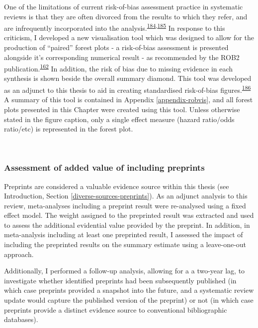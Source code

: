 \documentclass[a4paper, twoside]{templates/ociamthesis}
\begin{document}
One of the limitations of current risk-of-bias assessment practice in systematic reviews is that they are often divorced from the results to which they refer, and are infrequently incorporated into the analysis.\textsuperscript{\protect\hyperlink{ref-marusic2020}{184},\protect\hyperlink{ref-katikireddi2015}{185}} In response to this criticism, I developed a new visualisation tool which was designed to allow for the production of ``paired'' forest plots - a risk-of-bias assessment is presented alongside it's corresponding numerical result - as recommended by the ROB2 publication.\textsuperscript{\protect\hyperlink{ref-sterne2019}{162}} In addition, the risk of bias due to missing evidence in each synthesis is shown beside the overall summary diamond. This tool was developed as an adjunct to this thesis to aid in creating standardised risk-of-bias figures.\textsuperscript{\protect\hyperlink{ref-mcguinness2020robvisPaper}{186}} A summary of this tool is contained in Appendix \ref{appendix-robvis}, and all forest plots presented in this Chapter were created using this tool. Unless otherwise stated in the figure caption, only a single effect measure (hazard ratio/odds ratio/etc) is represented in the forest plot.

~

\hypertarget{assessment-of-added-value-of-including-preprints}{%
\subsubsection{Assessment of added value of including preprints}\label{assessment-of-added-value-of-including-preprints}}

Preprints are considered a valuable evidence source within this thesis (see Introduction, Section \ref{diverse-sources-preprints}). As an adjunct analysis to this review, meta-analyses including a preprint result were re-analysed using a fixed effect model. The weight assigned to the preprinted result was extracted and used to assess the additional evidential value provided by the preprint. In addition, in meta-analysis including at least one preprinted result, I assessed the impact of including the preprinted results on the summary estimate using a leave-one-out approach.

Additionally, I performed a follow-up analysis, allowing for a a two-year lag, to investigate whether identified preprints had been subsequently published (in which case preprints provided a snapshot into the future, and a systematic review update would capture the published version of the preprint) or not (in which case preprints provide a distinct evidence source to conventional bibliographic databases).
\end{document}
